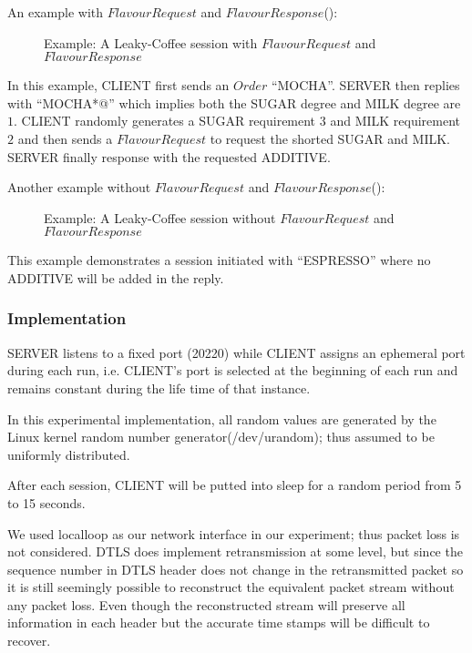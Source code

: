 \begin{example}
An example with $FlavourRequest$ and $FlavourResponse$():

{
\begin{figure}[H]
\centering
\resizebox{8cm}{!}
{}
\caption{Example: A Leaky-Coffee session with $FlavourRequest$ and $FlavourResponse$}
\label{Fig: Leaky-Coffee Example1}
\end{figure}
}
In this example, CLIENT first sends an $Order$ “MOCHA”. SERVER then replies with “MOCHA*@” which implies both the SUGAR degree and MILK degree are $1$. CLIENT randomly generates a SUGAR requirement $3$ and MILK requirement $2$ and then sends a $FlavourRequest$ to request the shorted SUGAR and MILK. SERVER finally response with the requested ADDITIVE.
\end{example}

\begin{example}
Another example without $FlavourRequest$ and $FlavourResponse$():

\begin{figure}[H]
\centering
\resizebox{6cm}{!}
{}
\caption{Example: A Leaky-Coffee session without $FlavourRequest$ and $FlavourResponse$}
\label{Fig: Leaky-Coffee Example2}
\end{figure}

This example demonstrates a session initiated with “ESPRESSO” where no ADDITIVE will be added in the reply.
\end{example}

\subsubsection{Implementation}
SERVER listens to a fixed port (20220) while CLIENT assigns an ephemeral port during each run, i.e. CLIENT’s port is selected at the beginning of each run and remains constant during the life time of that instance.

In this experimental implementation, all random values are generated by the Linux kernel random number generator(/dev/urandom); thus assumed to be uniformly distributed. 

After each session, CLIENT will be putted into sleep for a random period from 5 to 15 seconds.

We used localloop as our network interface in our experiment; thus packet loss is not considered. DTLS does implement retransmission at some level, but since the sequence number in DTLS header does not change in the retransmitted packet so it is still seemingly possible to reconstruct the equivalent packet stream without any packet loss. Even though the reconstructed stream will preserve all information in each header but the accurate time stamps will be difficult to recover.

